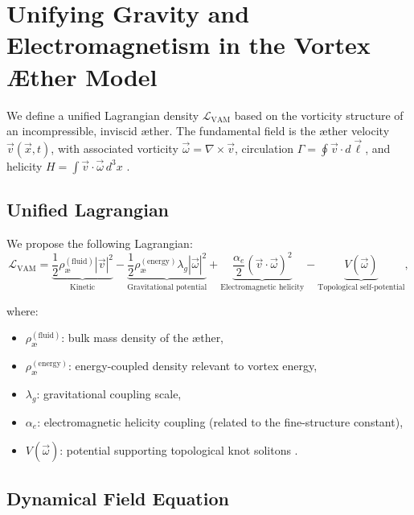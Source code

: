 \section{Unifying Gravity and Electromagnetism in the Vortex \AE ther Model}

We define a unified Lagrangian density \( \mathcal{L}_\text{VAM} \) based on the vorticity structure of an incompressible, inviscid æther. The fundamental field is the æther velocity \( \vec{v}(\vec{x}, t) \), with associated vorticity \( \vec{\omega} = \nabla \times \vec{v} \), circulation \( \Gamma = \oint \vec{v} \cdot d\vec{\ell} \), and helicity \( H = \int \vec{v} \cdot \vec{\omega} \, d^3x \) \cite{moffatt1969degree, arnold1998topological}.

\subsection*{Unified Lagrangian}

We propose the following Lagrangian:
\begin{equation}
\label{eq:L_VAM}
\mathcal{L}_\text{VAM} =
\underbrace{\frac{1}{2} \rho_\text{\ae}^{(\text{fluid})} |\vec{v}|^2}_{\text{Kinetic}} -
\underbrace{\frac{1}{2} \rho_\text{\ae}^{(\text{energy})} \lambda_g |\vec{\omega}|^2}_{\text{Gravitational potential}} +
\underbrace{\frac{\alpha_e}{2} (\vec{v} \cdot \vec{\omega})^2}_{\text{Electromagnetic helicity}} -
\underbrace{V(\vec{\omega})}_{\text{Topological self-potential}},
\end{equation}

where:
\begin{itemize}
    \item \( \rho_\text{\ae}^{(\text{fluid})} \): bulk mass density of the æther,
    \item \( \rho_\text{\ae}^{(\text{energy})} \): energy-coupled density relevant to vortex energy,
    \item \( \lambda_g \): gravitational coupling scale,
    \item \( \alpha_e \): electromagnetic helicity coupling (related to the fine-structure constant),
    \item \( V(\vec{\omega}) \): potential supporting topological knot solitons \cite{faddeev1997stable, babaev2002knotted}.
\end{itemize}

\subsection*{Dynamical Field Equation}

